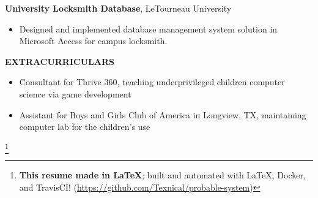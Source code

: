\documentclass[letterpaper]{article}
\newcommand{\altsection}[1]{\noindent\textbf{#1}\smallskip}
\newcommand{\entry}[3]{\textbf{#1}, #2\begin{itemize}[leftmargin=3.5em]#3\end{itemize}\bigskip}
\newcommand\eol[1]{%
    \begingroup
    \renewcommand\thefootnote{}\footnote{#1}%
    \addtocounter{footnote}{-1}%
    \endgroup
}
\begin{document}
\entry{University Locksmith Database}{LeTourneau University} {
    \item Designed and implemented database management system solution in Microsoft Access for campus locksmith.
}



\altsection{EXTRACURRICULARS}

\begin{itemize}[leftmargin=3.5em]
\item Consultant for Thrive 360, teaching underprivileged children computer science via game development
\item Assistant for Boys and Girls Club of America in Longview, TX, maintaining computer lab for the children's use
\end{itemize}

\eol{\noindent\textbf{This resume made in \LaTeX{}}; built and automated with \LaTeX{}, Docker, and TravisCI! (\url{https://github.com/Texnical/probable-system})}
\end{document}
